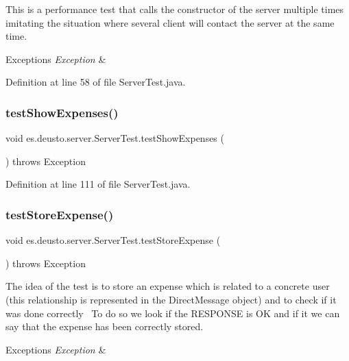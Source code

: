 This is a performance test that calls the constructor of the server multiple times imitating the situation where several client will contact the server at the same time. 
\begin{DoxyExceptions}{Exceptions}
{\em Exception} & \\
\hline
\end{DoxyExceptions}


Definition at line 58 of file Server\+Test.\+java.

\mbox{\label{classes_1_1deusto_1_1server_1_1_server_test_ade86728a524037a1712106cd4741c690}} 
\subsubsection{\texorpdfstring{test\+Show\+Expenses()}{testShowExpenses()}}
{\footnotesize\ttfamily void es.\+deusto.\+server.\+Server\+Test.\+test\+Show\+Expenses (\begin{DoxyParamCaption}{ }\end{DoxyParamCaption}) throws Exception}



Definition at line 111 of file Server\+Test.\+java.

\mbox{\label{classes_1_1deusto_1_1server_1_1_server_test_a7406203a7ff08400597008ca722f6205}} 
\subsubsection{\texorpdfstring{test\+Store\+Expense()}{testStoreExpense()}}
{\footnotesize\ttfamily void es.\+deusto.\+server.\+Server\+Test.\+test\+Store\+Expense (\begin{DoxyParamCaption}{ }\end{DoxyParamCaption}) throws Exception}

The idea of the test is to store an expense which is related to a concrete user (this relationship is represented in the Direct\+Message object) and to check if it was done correctly~\newline
To do so we look if the R\+E\+S\+P\+O\+N\+SE is OK and if it we can say that the expense has been correctly stored. 
\begin{DoxyExceptions}{Exceptions}
{\em Exception} & \\
\hline
\end{DoxyExceptions}


